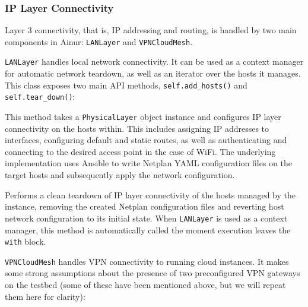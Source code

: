 \subsubsection{\gls{IP} Layer Connectivity}\label{sec:layer3}

Layer 3 connectivity, that is, \gls{IP} addressing and routing, is handled by two main components in Ainur: \texttt{LANLayer} and \texttt{VPNCloudMesh}.

\texttt{LANLayer} handles local network connectivity.
It can be used as a context manager for automatic network teardown, as well as an iterator over the hosts it manages.
This class exposes two main \gls{API} methods, \texttt{self.add_hosts()} and \texttt{self.tear_down()}:
\begin{description}[]
    \item[\texttt{LANLayer.add_hosts(self, layer2)}]
    This method takes a \texttt{PhysicalLayer} object instance and configures \gls{IP} layer connectivity on the hosts within.
    This includes assigning \gls{IP} addresses to interfaces, configuring default and static routes, as well as authenticating and connecting to the desired access point in the case of WiFi.
    The underlying implementation uses Ansible to write Netplan YAML configuration files on the target hosts and subsequently apply the network configuration.

    \item[\texttt{LANLayer.tear_down(self)}]
    Performs a clean teardown of \gls{IP} layer connectivity of the hosts managed by the instance, removing the created Netplan configuration files and reverting host network configuration to its initial state.
    When \texttt{LANLayer} is used as a context manager, this method is automatically called the moment execution leaves the \texttt{with} block.
\end{description}

\texttt{VPNCloudMesh}\label{sec:vpn} handles \gls{VPN} connectivity to running cloud instances.
It makes some strong assumptions about the presence of two preconfigured \gls{VPN} gateways on the testbed (some of these have been mentioned above, but we will repeat them here for clarity):

